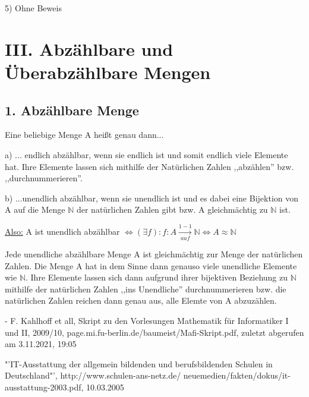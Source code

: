\documentclass[12pt]{article}
\begin{document}
		5) Ohne Beweis
		
		\section*{III. Abzählbare und Überabzählbare Mengen}
		
		\subsection*{1. Abzählbare Menge}
		
		Eine beliebige Menge A heißt genau dann...
		
		a) ... endlich abzählbar, wenn sie endlich ist und somit endlich viele Elemente hat. Ihre Elemente lassen
		   sich mithilfe  der Natürlichen Zahlen ,,abzählen'' bzw. ,,durchnummerieren''.
		
		b) ...unendlich abzählbar, wenn sie unendlich ist und es dabei eine Bijektion von A auf die Menge $\mathbb{N}$ der natürlichen Zahlen
		gibt bzw. A gleichmächtig zu $\mathbb{N}$ ist.
		
		\underline{Also:}
		A ist unendlich abzählbar $\Leftrightarrow (\exists f): f: A \xrightarrow[auf]{1-1} \mathbb{N} \Leftrightarrow A \approx \mathbb{N}$
		
		Jede unendliche abzählbare Menge A ist gleichmächtig zur Menge der natürlichen Zahlen. Die Menge A hat in dem Sinne dann genauso viele unendliche
		Elemente wie $\mathbb{N}$. Ihre Elemente lassen sich dann aufgrund ihrer bijektiven Beziehung zu $\mathbb{N}$ mithilfe der natürlichen Zahlen ,,ins Unendliche''
		durchnummerieren bzw. die natürlichen Zahlen reichen dann genau aus, alle Elemte von A abzuzählen.


    \newpage

    \appendix

    \newpage
		
		- F. Kahlhoff et all, Skript zu den Vorlesungen Mathematik für Informatiker I und II, 2009/10, 
			page.mi.fu-berlin.de/baumeist/Mafi-Skript.pdf, zuletzt abgerufen am 3.11.2021, 19:05

    \begin{thebibliography}{xxxxxxxxxxxxxxxxxxx}
       "'IT-Ausstattung der allgemein bildenden und berufsbildenden
                                   Schulen in Deutschland"', http://www.schulen-ans-netz.de/
                                   neuemedien/fakten/dokus/it-ausstattung-2003.pdf, 10.03.2005
    \end{thebibliography}
\end{document}
